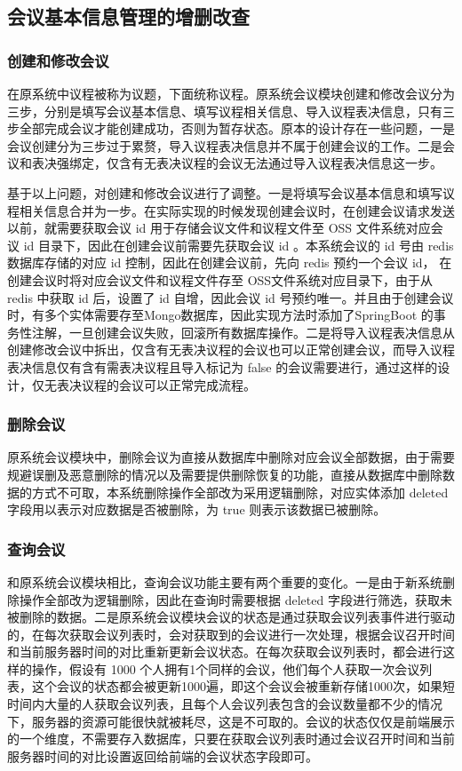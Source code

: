 \subsection{会议基本信息管理的增删改查}
\subsubsection{创建和修改会议}
在原系统中议程被称为议题，下面统称议程。原系统会议模块创建和修改会议分为三步，分别是填写会议基本信息、填写议程相关信息、导入议程表决信息，只有三步全部完成会议才能创建成功，否则为暂存状态。原本的设计存在一些问题，一是会议创建分为三步过于累赘，导入议程表决信息并不属于创建会议的工作。二是会议和表决强绑定，仅含有无表决议程的会议无法通过导入议程表决信息这一步。

基于以上问题，对创建和修改会议进行了调整。一是将填写会议基本信息和填写议程相关信息合并为一步。在实际实现的时候发现创建会议时，在创建会议请求发送以前，就需要获取会议 id 用于存储会议文件和议程文件至 OSS 文件系统对应会议 id 目录下，因此在创建会议前需要先获取会议 id 。本系统会议的 id 号由 redis 数据库存储的对应 id 控制，因此在创建会议前，先向 redis 预约一个会议 id， 在创建会议时将对应会议文件和议程文件存至 OSS文件系统对应目录下，由于从 redis 中获取 id 后，设置了 id 自增，因此会议 id 号预约唯一。并且由于创建会议时，有多个实体需要存至Mongo数据库，因此实现方法时添加了SpringBoot 的事务性注解，一旦创建会议失败，回滚所有数据库操作。二是将导入议程表决信息从创建修改会议中拆出，仅含有无表决议程的会议也可以正常创建会议，而导入议程表决信息仅有含有需表决议程且导入标记为 false 的会议需要进行，通过这样的设计，仅无表决议程的会议可以正常完成流程。

\subsubsection{删除会议}
原系统会议模块中，删除会议为直接从数据库中删除对应会议全部数据，由于需要规避误删及恶意删除的情况以及需要提供删除恢复的功能，直接从数据库中删除数据的方式不可取，本系统删除操作全部改为采用逻辑删除，对应实体添加 deleted 字段用以表示对应数据是否被删除，为 true 则表示该数据已被删除。

\subsubsection{查询会议}
和原系统会议模块相比，查询会议功能主要有两个重要的变化。一是由于新系统删除操作全部改为逻辑删除，因此在查询时需要根据 deleted 字段进行筛选，获取未被删除的数据。二是原系统会议模块会议的状态是通过获取会议列表事件进行驱动的，在每次获取会议列表时，会对获取到的会议进行一次处理，根据会议召开时间和当前服务器时间的对比重新更新会议状态。在每次获取会议列表时，都会进行这样的操作，假设有 1000 个人拥有1个同样的会议，他们每个人获取一次会议列表，这个会议的状态都会被更新1000遍，即这个会议会被重新存储1000次，如果短时间内大量的人获取会议列表，且每个人会议列表包含的会议数量都不少的情况下，服务器的资源可能很快就被耗尽，这是不可取的。会议的状态仅仅是前端展示的一个维度，不需要存入数据库，只要在获取会议列表时通过会议召开时间和当前服务器时间的对比设置返回给前端的会议状态字段即可。

